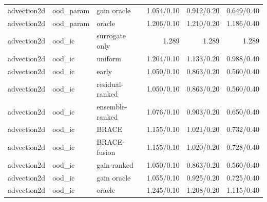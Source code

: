 \begin{tabular}{lllrrr}
advection2d & ood\_param & gain oracle & 1.054/0.10 & 0.912/0.20 & 0.649/0.40 \\
advection2d & ood\_param & oracle & 1.206/0.10 & 1.210/0.20 & 1.186/0.40 \\
\midrule
advection2d & ood\_ic & surrogate only & 1.289 & 1.289 & 1.289 \\
advection2d & ood\_ic & uniform & 1.204/0.10 & 1.133/0.20 & 0.988/0.40 \\
advection2d & ood\_ic & early & 1.050/0.10 & 0.863/0.20 & 0.560/0.40 \\
advection2d & ood\_ic & residual-ranked & 1.050/0.10 & 0.863/0.20 & 0.560/0.40 \\
advection2d & ood\_ic & ensemble-ranked & 1.076/0.10 & 0.903/0.20 & 0.650/0.40 \\
advection2d & ood\_ic & BRACE & 1.155/0.10 & 1.021/0.20 & 0.732/0.40 \\
advection2d & ood\_ic & BRACE-fusion & 1.155/0.10 & 1.020/0.20 & 0.728/0.40 \\
advection2d & ood\_ic & gain-ranked & 1.050/0.10 & 0.863/0.20 & 0.560/0.40 \\
advection2d & ood\_ic & gain oracle & 1.055/0.10 & 0.925/0.20 & 0.725/0.40 \\
advection2d & ood\_ic & oracle & 1.245/0.10 & 1.208/0.20 & 1.115/0.40 \\
\midrule
\bottomrule
\end{tabular}
